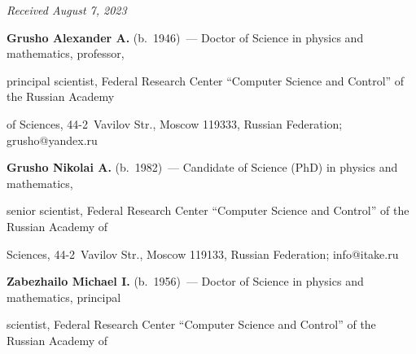 \vspace*{-7pt}





\hfill{\small\textit{Received August 7, 2023}} 





\vspace*{-15pt} 





\Contr





\vspace*{-5pt}





\noindent


\textbf{Grusho Alexander A.} (b.\ 1946)~--- Doctor of Science in physics and mathematics, professor, 


principal scientist, Federal Research Center ``Computer Science and Control'' of the Russian Academy 


of Sciences, 44-2~Vavilov Str., Moscow 119333, Russian Federation; \mbox{grusho@yandex.ru}





\vspace*{3pt}





\noindent


\textbf{Grusho Nikolai A.} (b.\ 1982)~--- Candidate of Science (PhD) in physics and mathematics, 


senior scientist, Federal Research Center ``Computer Science and Control'' of the Russian Academy of 


Sciences, 44-2~Vavilov Str., Moscow 119133, Russian Federation; \mbox{info@itake.ru}








\vspace*{3pt}





\noindent


\textbf{Zabezhailo Michael I.} (b.\ 1956)~--- Doctor of Science in physics and mathematics, principal 


scientist, Federal Research Center ``Computer Science and Control'' of the Russian Academy of 


